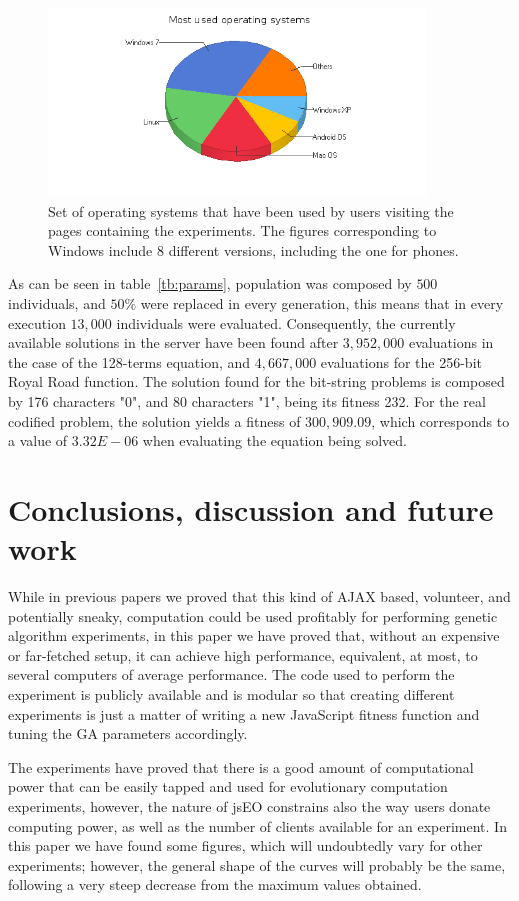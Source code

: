 \documentclass[runningheads,a4paper]{llncs}
\begin{document}
\begin{figure}
\centering
\includegraphics[height=5cm]{Most_Used_Operating_Systems}
\caption{Set of operating systems that have been used by users visiting the pages containing the experiments. The figures corresponding to Windows include 8 different versions, including the one for phones.
}
\label{fig:jsEO-str}
\end{figure}

As can be seen in table~\ref{tb:params}, population was composed by $500$ individuals, and $50\%$ were replaced in every generation, this means that in every execution $13,000$ individuals were evaluated. Consequently, the currently available solutions in the server have been found after $3,952,000$ evaluations in the case of the 128-terms equation, and $4,667,000$ evaluations for the 256-bit Royal Road function. The solution found for the bit-string problems is composed by 176 characters "0", and 80 characters "1", being  its fitness 232. For the real codified problem, the solution yields a fitness of $300,909.09$, which corresponds to a value of $3.32E-06$ when evaluating the equation being solved.

\section{Conclusions, discussion and future work}
\label{sec:conc}

While in previous papers  we proved that
this kind of AJAX based, volunteer, and potentially sneaky,
computation could be used profitably for performing genetic algorithm
experiments, in this paper we have proved that, 
without an expensive or far-fetched setup, it can achieve high
performance, equivalent, at most, to several computers of average
performance. The code used to perform the experiment is publicly
available and is modular so that creating different experiments is
just a matter of writing a new JavaScript fitness function and tuning
the GA parameters accordingly. 

The experiments have proved that there is a good amount of
computational power that can be easily tapped and used for
evolutionary computation experiments, however, the nature of jsEO
constrains also the way users donate computing power, as well as the
number of clients available for an experiment. In this paper we have
found some figures, which will undoubtedly vary for other experiments;
however, the general shape of the curves will probably be the same,
following a very steep decrease from the maximum values obtained. 
\end{document}
